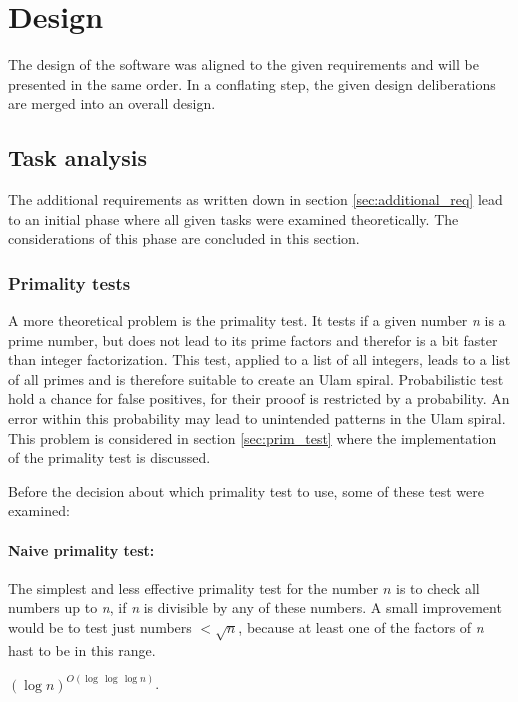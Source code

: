 \section{Design}
\label{sec:design}
The design of the software was aligned to the given requirements and will be presented in the same order. In a conflating step, the given design deliberations are merged into an overall design.

\subsection{Task analysis}
The additional requirements as written down in section \ref{sec:additional_req} lead to an initial phase where all given tasks were examined theoretically. The considerations of this phase are concluded in this section.

\subsubsection{Primality tests}
\label{sec:primality_test}
A more theoretical problem is the primality test. It tests if a given number \emph{n} is a prime number, but does not lead to its prime factors and therefor is a bit faster than integer factorization. This test, applied to a list of all integers, leads to a list of all primes and is therefore suitable to create an Ulam spiral. Probabilistic test hold a chance for false positives, for their prooof is restricted by a probability. An error within this probability may lead to unintended patterns in the Ulam spiral. This problem is considered in section \ref{sec:prim_test} where the implementation of the primality test is discussed.

Before the decision about which primality test to use, some of these test were examined:

\paragraph{Naive primality test:}
The simplest and less effective primality test for the number $n$ is to check all numbers up to \emph{n}, if \emph{n} is divisible by any of these numbers. A small improvement would be to  test just numbers $< \sqrt{n}$, because at least one of the factors of \emph{n} hast to be in this range.

    $(\log n)^{O(\log\,\log \,\log n)}$. 

